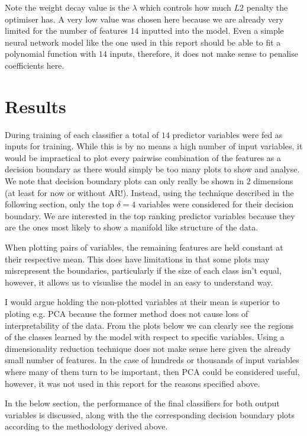 \documentclass{article}
\begin{document}
Note the weight decay value is the $\lambda$ which controls how much $L2$ penalty the optimiser has. A very low value was chosen here because we are already very limited for the number of features $14$ inputted into the model. Even a simple neural network model like the one used in this report should be able to fit a polynomial function with $14$ inputs, therefore, it does not make sense to penalise coefficients here.

\section{Results}

During training of each classifier a total of $14$ predictor variables were fed as inputs for training. While this is by no means a high number of input variables, it would be impractical to plot every pairwise combination of the features as a decision boundary as there would simply be too many plots to show and analyse. We note that decision boundary plots can only really be shown in 2 dimensions (at least for now or without AR!). Instead, using the technique described in the following section, only the top $\delta = 4$ variables were considered for their decision boundary. We are interested in the top ranking predictor variables because they are the ones most likely to show a manifold like structure of the data.

When plotting pairs of variables, the remaining features are held constant at their respective mean. This does have limitations in that some plots may misrepresent the boundaries, particularly if the size of each class isn't equal, however, it allows us to visualise the model in an easy to understand way.

I would argue holding the non-plotted variables at their mean is superior to ploting e.g. PCA because the former method does not cause loss of interpretability of the data. From the plots below we can clearly see the regions of the classes learned by the model with respect to specific variables. Using a dimensionality reduction technique does not make sense here given the already small number of features. In the case of hundreds or thousands of input variables where many of them turn to be important, then PCA could be considered useful, however, it was not used in this report for the reasons specified above.

In the below section, the performance of the final classifiers for both output variables is discussed, along with the the corresponding decision boundary plots according to the methodology derived above.
\end{document}
